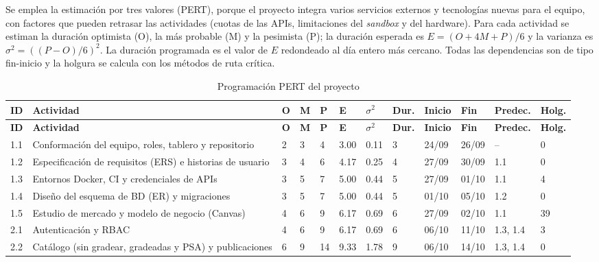 \documentclass[letterpaper,11pt]{article}
\begin{document}
Se emplea la estimación por tres valores (PERT), porque el proyecto integra varios servicios externos y tecnologías nuevas para el equipo, con factores que pueden retrasar las actividades (cuotas de las APIs, limitaciones del \textit{sandbox} y del hardware). Para cada actividad se estiman la duración optimista (O), la más probable (M) y la pesimista (P); la duración esperada es $E=(O+4M+P)/6$ y la varianza es $\sigma^2=((P-O)/6)^2$. La duración programada es el valor de $E$ redondeado al día entero más cercano. Todas las dependencias son de tipo fin-inicio y la holgura se calcula con los métodos de ruta crítica.

{\scriptsize
\setlength{\tabcolsep}{2pt}
\begin{longtable}{|p{0.9cm}|>{\raggedright\arraybackslash}p{4.4cm}|p{0.5cm}|p{0.5cm}|p{0.5cm}|p{0.8cm}|p{0.8cm}|p{0.75cm}|p{1.1cm}|p{1.1cm}|p{1.6cm}|p{0.75cm}|}
\caption{Programación PERT del proyecto}\\
\hline
\textbf{ID} & \textbf{Actividad} & \textbf{O} & \textbf{M} & \textbf{P} & \textbf{E} & $\sigma^2$ & \textbf{Dur.} & \textbf{Inicio} & \textbf{Fin} & \textbf{Predec.} & \textbf{Holg.} \\ \hline
\endfirsthead
\hline
\textbf{ID} & \textbf{Actividad} & \textbf{O} & \textbf{M} & \textbf{P} & \textbf{E} & $\sigma^2$ & \textbf{Dur.} & \textbf{Inicio} & \textbf{Fin} & \textbf{Predec.} & \textbf{Holg.} \\ \hline
\endhead
1.1 & Conformación del equipo, roles, tablero y repositorio & 2 & 3 & 4 & 3.00 & 0.11 & 3 & 24/09 & 26/09 & -- & 0 \\ \hline
1.2 & Especificación de requisitos (ERS) e historias de usuario & 3 & 4 & 6 & 4.17 & 0.25 & 4 & 27/09 & 30/09 & 1.1 & 0 \\ \hline
1.3 & Entornos Docker, CI y credenciales de APIs & 3 & 5 & 7 & 5.00 & 0.44 & 5 & 27/09 & 01/10 & 1.1 & 4 \\ \hline
1.4 & Diseño del esquema de BD (ER) y migraciones & 3 & 5 & 7 & 5.00 & 0.44 & 5 & 01/10 & 05/10 & 1.2 & 0 \\ \hline
1.5 & Estudio de mercado y modelo de negocio (Canvas) & 4 & 6 & 9 & 6.17 & 0.69 & 6 & 27/09 & 02/10 & 1.1 & 39 \\ \hline
2.1 & Autenticación y RBAC & 4 & 6 & 9 & 6.17 & 0.69 & 6 & 06/10 & 11/10 & 1.3, 1.4 & 3 \\ \hline
2.2 & Catálogo (sin gradear, gradeadas y PSA) y publicaciones & 6 & 9 & 14 & 9.33 & 1.78 & 9 & 06/10 & 14/10 & 1.3, 1.4 & 0 \\ \hline

\end{longtable}}
\end{document}
